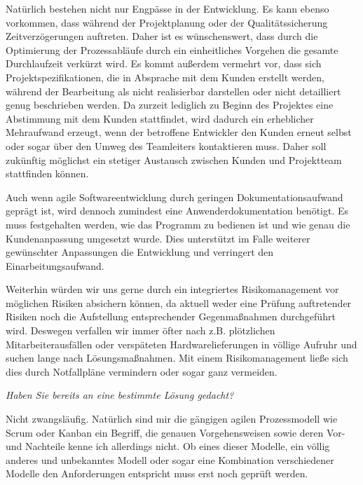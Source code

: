 Natürlich bestehen nicht nur Engpässe in der Entwicklung. Es kann ebenso vorkommen, dass während der Projektplanung oder der Qualitätssicherung Zeitverzögerungen auftreten. Daher ist es wünschenswert, dass durch die Optimierung der Prozessabläufe durch ein einheitliches Vorgehen die gesamte Durchlaufzeit verkürzt wird.
Es kommt außerdem vermehrt vor, dass sich Projektspezifikationen, die in Absprache mit dem Kunden erstellt werden, während der Bearbeitung als nicht realisierbar darstellen oder nicht detailliert genug beschrieben werden. Da zurzeit lediglich zu Beginn des Projektes eine Abstimmung mit dem Kunden stattfindet, wird dadurch ein erheblicher Mehraufwand erzeugt, wenn der betroffene Entwickler den Kunden erneut selbst oder sogar über den Umweg des Teamleiters kontaktieren muss. Daher soll zukünftig möglichst ein stetiger Austausch zwischen Kunden und Projektteam stattfinden können.

Auch wenn agile Softwareentwicklung durch geringen Dokumentationsaufwand geprägt ist, wird dennoch zumindest eine Anwenderdokumentation benötigt. Es muss festgehalten werden, wie das Programm zu bedienen ist und wie genau die Kundenanpassung umgesetzt wurde. Dies unterstützt im Falle weiterer gewünschter Anpassungen die Entwicklung und verringert den Einarbeitungsaufwand.

Weiterhin würden wir uns gerne durch ein integriertes Risikomanagement vor möglichen Risiken absichern können, da aktuell weder eine Prüfung auftretender Risiken noch die Aufstellung entsprechender Gegenmaßnahmen durchgeführt wird. Deswegen verfallen wir immer öfter nach z.B. plötzlichen Mitarbeiterausfällen oder verspäteten Hardwarelieferungen in völlige Aufruhr und suchen lange nach Lösungsmaßnahmen. Mit einem Risikomanagement ließe sich dies durch Notfallpläne vermindern oder sogar ganz vermeiden.

\textit{Haben Sie bereits an eine bestimmte Lösung gedacht?}

Nicht zwangsläufig. Natürlich sind mir die gängigen agilen Prozessmodell wie Scrum oder Kanban ein Begriff, die genauen Vorgehensweisen sowie deren Vor- und Nachteile kenne ich allerdings nicht. Ob eines dieser Modelle, ein völlig anderes und unbekanntes Modell oder sogar eine Kombination verschiedener Modelle den Anforderungen entspricht muss erst noch geprüft werden.
